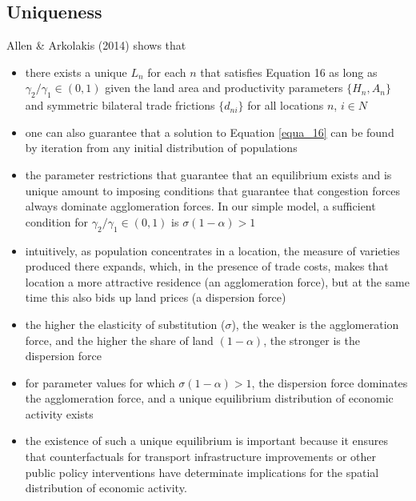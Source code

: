 \documentclass[11pt]{article}
\begin{document}
\subsection*{Uniqueness}
Allen \& Arkolakis (2014) shows that 
\begin{itemize}
\item there exists a unique $L_{n}$ for each $n$ that satisfies Equation 16 as long as $\gamma_{2} / \gamma_{1} \in (0, 1)$ given the land area and productivity parameters $\lbrace H_{n} , A_{n} \rbrace$ and symmetric bilateral trade frictions $\lbrace d_{ni} \rbrace$ for all locations $n$, $i \in N$
\item one can also guarantee that a solution to Equation \ref{equa_16} can be found by iteration from any initial distribution of populations
\item the parameter restrictions that guarantee that an equilibrium exists and is unique amount to imposing conditions that guarantee that congestion forces always dominate agglomeration forces. In our simple model, a sufficient condition for $\gamma_{2} / \gamma_{1} \in (0, 1)$ is $\sigma (1 − \alpha ) > 1$
\item intuitively, as population concentrates in a location, the measure of varieties produced there expands, which, in the presence of trade costs, makes that location a more attractive residence (an agglomeration force), but at the same time this also bids up land prices (a dispersion force)
\item the higher the elasticity of substitution ($\sigma $), the weaker is the agglomeration force, and the higher the share of land $(1-\alpha )$, the stronger is the dispersion force
\item for parameter values for which $\sigma (1 − \alpha ) > 1$, the dispersion force dominates the agglomeration force, and a unique equilibrium distribution of economic activity exists
\item the existence of such a unique equilibrium is important because it ensures that counterfactuals for transport infrastructure improvements or other public policy interventions have determinate implications for the spatial distribution of economic activity.
\end{itemize}
\end{document}
